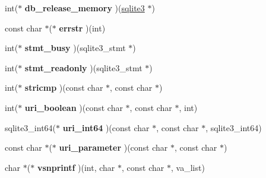 \begin{DoxyCompactItemize}
\item 
int($\ast$ {\bfseries db\+\_\+release\+\_\+memory} )(\hyperlink{structsqlite3}{sqlite3} $\ast$)\hypertarget{structsqlite3__api__routines_ae2363076a42752e78fbbd95df7d904f2}{}\label{structsqlite3__api__routines_ae2363076a42752e78fbbd95df7d904f2}

\item 
const char $\ast$($\ast$ {\bfseries errstr} )(int)\hypertarget{structsqlite3__api__routines_abe13e230a5758742b704f4361c20836c}{}\label{structsqlite3__api__routines_abe13e230a5758742b704f4361c20836c}

\item 
int($\ast$ {\bfseries stmt\+\_\+busy} )(sqlite3\+\_\+stmt $\ast$)\hypertarget{structsqlite3__api__routines_acb29457d970ab9854d35446f207933e4}{}\label{structsqlite3__api__routines_acb29457d970ab9854d35446f207933e4}

\item 
int($\ast$ {\bfseries stmt\+\_\+readonly} )(sqlite3\+\_\+stmt $\ast$)\hypertarget{structsqlite3__api__routines_a6d2a2daec1f9215ac15ac9c941919248}{}\label{structsqlite3__api__routines_a6d2a2daec1f9215ac15ac9c941919248}

\item 
int($\ast$ {\bfseries stricmp} )(const char $\ast$, const char $\ast$)\hypertarget{structsqlite3__api__routines_a0e2d9055bbe019f4232902c413c240d5}{}\label{structsqlite3__api__routines_a0e2d9055bbe019f4232902c413c240d5}

\item 
int($\ast$ {\bfseries uri\+\_\+boolean} )(const char $\ast$, const char $\ast$, int)\hypertarget{structsqlite3__api__routines_a5b22d69516c01562f7e5bfa61a5a09e4}{}\label{structsqlite3__api__routines_a5b22d69516c01562f7e5bfa61a5a09e4}

\item 
sqlite3\+\_\+int64($\ast$ {\bfseries uri\+\_\+int64} )(const char $\ast$, const char $\ast$, sqlite3\+\_\+int64)\hypertarget{structsqlite3__api__routines_a03be0cdc22e246acc8c0fc15a7be4b24}{}\label{structsqlite3__api__routines_a03be0cdc22e246acc8c0fc15a7be4b24}

\item 
const char $\ast$($\ast$ {\bfseries uri\+\_\+parameter} )(const char $\ast$, const char $\ast$)\hypertarget{structsqlite3__api__routines_a54befd2fff5d4cddcf2bdb05df470f9b}{}\label{structsqlite3__api__routines_a54befd2fff5d4cddcf2bdb05df470f9b}

\item 
char $\ast$($\ast$ {\bfseries vsnprintf} )(int, char $\ast$, const char $\ast$, va\+\_\+list)\hypertarget{structsqlite3__api__routines_ad1f8c7c0b8a41360b3da6238f169f2b9}{}\label{structsqlite3__api__routines_ad1f8c7c0b8a41360b3da6238f169f2b9}


\end{DoxyCompactItemize}
